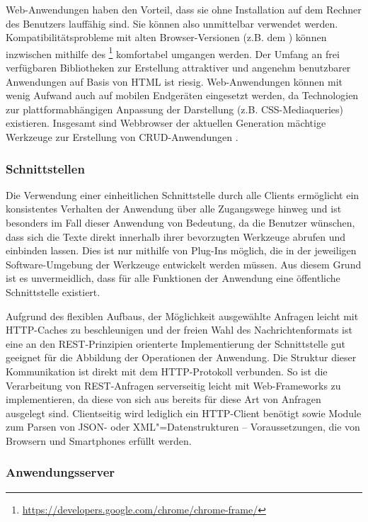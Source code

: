 Web-Anwendungen haben den Vorteil, dass sie ohne Installation auf dem Rechner des Benutzers lauffähig sind. Sie können also unmittelbar verwendet werden. Kompatibilitätsprobleme mit alten Browser-Versionen (z.B. dem ) können inzwischen mithilfe des \footnote{\url{https://developers.google.com/chrome/chrome-frame/}} komfortabel umgangen werden. Der Umfang an frei verfügbaren Bibliotheken zur Erstellung attraktiver und angenehm benutzbarer Anwendungen auf Basis von HTML ist riesig. Web-Anwendungen können mit wenig Aufwand auch auf mobilen Endgeräten eingesetzt werden, da Technologien zur plattformabhängigen Anpassung der Darstellung (z.B. CSS-Mediaqueries) existieren. Insgesamt sind Webbrowser der aktuellen Generation mächtige Werkzeuge zur Erstellung von CRUD-Anwendungen \cite{ms-key-software-development-trends} .

\subsubsection{Schnittstellen} 

Die Verwendung einer einheitlichen Schnittstelle durch alle Clients ermöglicht ein konsistentes Verhalten der Anwendung über alle Zugangswege hinweg und ist besonders im Fall dieser Anwendung von Bedeutung, da die Benutzer wünschen, dass sich die Texte direkt innerhalb ihrer bevorzugten Werkzeuge abrufen und einbinden lassen. Dies ist nur mithilfe von Plug-Ins möglich, die in der jeweiligen Software-Umgebung der Werkzeuge entwickelt werden müssen. Aus diesem Grund ist es unvermeidlich, dass für alle Funktionen der Anwendung eine öffentliche Schnittstelle existiert.

Aufgrund des flexiblen Aufbaus, der Möglichkeit ausgewählte Anfragen leicht mit HTTP-Caches zu beschleunigen und der freien Wahl des Nachrichtenformats ist eine an den REST-Prinzipien orienterte Implementierung der Schnittstelle gut geeignet für die Abbildung der Operationen der Anwendung. Die Struktur dieser Kommunikation ist direkt mit dem HTTP-Protokoll verbunden. So ist die Verarbeitung von REST-Anfragen serverseitig leicht mit Web-Frameworks zu implementieren, da diese von sich aus bereits für diese Art von Anfragen ausgelegt sind. Clientseitig wird lediglich ein HTTP-Client benötigt sowie Module zum Parsen von JSON- oder XML"=Datenstrukturen -- Voraussetzungen, die von Browsern und Smartphones erfüllt werden. 

\subsubsection{Anwendungsserver}

